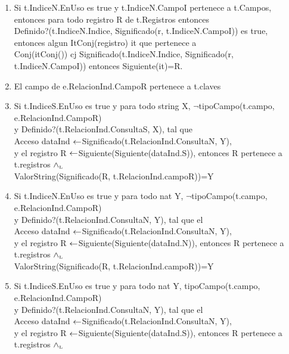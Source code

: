 \begin{enumerate}
\item	Si t.IndiceN.EnUso es true y t.IndiceN.CampoI pertenece a t.Campos, \\
entonces para todo registro R de t.Registros entonces \\
Definido?(t.IndiceN.Indice, Significado(r, t.IndiceN.CampoI)) es true, \\
entonces algun ItConj(registro) it que pertenece a \\
Conj(itConj()) cj Significado(t.IndiceN.Indice, Significado(r, t.IndiceN.CampoI)) entonces Siguiente(it)=R.


\item El campo de e.RelacionInd.CampoR pertenece a t.claves
\item Si t.IndiceS.EnUso es true y para todo string X, $\neg$tipoCampo(t.campo, e.RelacionInd.CampoR) \\y 
Definido?(t.RelacionInd.ConsultaS, X), tal que \\Acceso dataInd $\leftarrow$Significado(t.RelacionInd.ConsultaN, Y), \\
y el registro R $\leftarrow$Siguiente(Siguiente(dataInd.S)), entonces R pertenece a t.registros $\land_{\mathrm{\scriptscriptstyle{L}}}$ \\
ValorString(Significado(R, t.RelacionInd.campoR))=Y
\item Si t.IndiceN.EnUso es true y para todo nat Y, $\neg$tipoCampo(t.campo, e.RelacionInd.CampoR) \\y Definido?(t.RelacionInd.ConsultaN, Y), tal que el
\\Acceso dataInd $\leftarrow$Significado(t.RelacionInd.ConsultaN, Y), \\
y el registro R $\leftarrow$Siguiente(Siguiente(dataInd.N)), entonces R pertenece a t.registros $\land_{\mathrm{\scriptscriptstyle{L}}}$ \\
ValorString(Significado(R, t.RelacionInd.campoR))=Y
\item Si t.IndiceS.EnUso es true y para todo nat Y, tipoCampo(t.campo, e.RelacionInd.CampoR) \\y Definido?(t.RelacionInd.ConsultaN, Y), tal que el\\
 Acceso dataInd $\leftarrow$Significado(t.RelacionInd.ConsultaN, Y), \\
 y el registro R $\leftarrow$Siguiente(Siguiente(dataInd.S)), entonces R pertenece a t.registros $\land_{\mathrm{\scriptscriptstyle{L}}}$ \\

\end{enumerate}
